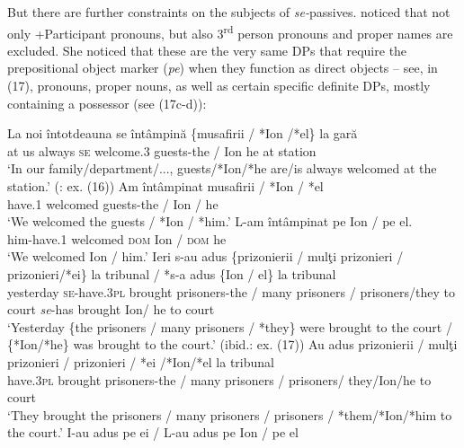 \documentclass[output=paper]{langsci/langscibook}
\begin{document}
But there are further constraints on the subjects of \textit{se-}passives. \citet{Cornilescu1998} noticed that not only +Participant pronouns, but also 3\textsuperscript{rd} person pronouns and proper names are excluded. She noticed that these are the very same DPs that require the prepositional object marker (\textit{pe}) when they function as direct objects – see, in (17), pronouns, proper nouns, as well as certain specific definite DPs, mostly containing a possessor (see (17c-d)):

\ea%
    \label{ex:giurgea:17}
    \begin{xlista}[c{'}{'}.]
    \ex
    \gll La noi întotdeauna se întâmpină  \{musafirii / *Ion /*el\} la gară  \\
         at us    always        \textsc{se} welcome.3   guests-the / Ion   he  at station\\
    \glt ‘In our family/department/..., guests/*Ion/*he are/is always welcomed at the station.’ (\citealt{Cornilescu1998}: ex. (16))
    \gll Am     întâmpinat musafirii / *Ion / *el\\
         have.1 welcomed guests-the / Ion / he   \\
    \glt ‘We welcomed  the guests / *Ion / *him.’
    \gll L-am          întâmpinat pe   Ion  / pe    el. \\
                him-have.1 welcomed \textsc{dom} Ion / \textsc{dom} he\\
    \glt        ‘We welcomed  Ion / him.’
    \ex
    \gll Ieri          s-au              adus    \{prizonierii   / mulţi prizonieri / prizonieri/*ei\}  la tribunal / *s-a       adus     \{Ion / el\} la tribunal    \\
         yesterday \textsc{se}{}-have.3\textsc{pl} brought prisoners-the / many prisoners / prisoners/they  to court \textit{se}{}-has brought  Ion/   he  to court\\
    \glt ‘Yesterday  \{the prisoners / many prisoners / *they\} were brought to the court / \{*Ion/*he\} was brought to the court.’ (ibid.: ex. (17))
    \gll Au          adus     prizonierii    / mulţi prizonieri  / prizonieri / *ei /*Ion/*el la tribunal\\
         have.\textsc{3pl} brought prisoners-the / many prisoners / prisoners/ they/Ion/he    to court\\
    \glt ‘They brought the prisoners / many prisoners / prisoners / *them/*Ion/*him to the court.’
    \gll I-au                 adus      pe    ei    /   L-au               adus      pe    Ion /   pe    el\\

\end{xlista}
\end{document}
